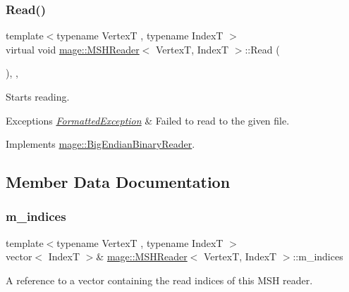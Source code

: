 \subsubsection{\texorpdfstring{Read()}{Read()}}
{\footnotesize\ttfamily template$<$typename VertexT , typename IndexT $>$ \\
virtual void \hyperlink{classmage_1_1_m_s_h_reader}{mage\+::\+M\+S\+H\+Reader}$<$ VertexT, IndexT $>$\+::Read (\begin{DoxyParamCaption}{ }\end{DoxyParamCaption})\hspace{0.3cm}{\ttfamily [override]}, {\ttfamily [private]}, {\ttfamily [virtual]}}

Starts reading.


\begin{DoxyExceptions}{Exceptions}
{\em \hyperlink{structmage_1_1_formatted_exception}{Formatted\+Exception}} & Failed to read to the given file. \\
\hline
\end{DoxyExceptions}


Implements \hyperlink{classmage_1_1_big_endian_binary_reader_af072965dea0319d6366b21cc6562bbf9}{mage\+::\+Big\+Endian\+Binary\+Reader}.



\subsection{Member Data Documentation}
\hypertarget{classmage_1_1_m_s_h_reader_ae96b703b052eb9951872683e17ab11ae}{}\label{classmage_1_1_m_s_h_reader_ae96b703b052eb9951872683e17ab11ae} 
\subsubsection{\texorpdfstring{m\+\_\+indices}{m\_indices}}
{\footnotesize\ttfamily template$<$typename VertexT , typename IndexT $>$ \\
vector$<$ IndexT $>$\& \hyperlink{classmage_1_1_m_s_h_reader}{mage\+::\+M\+S\+H\+Reader}$<$ VertexT, IndexT $>$\+::m\+\_\+indices\hspace{0.3cm}{\ttfamily [private]}}

A reference to a vector containing the read indices of this M\+SH reader. \hypertarget{classmage_1_1_m_s_h_reader_a6b4c0fbf02771cb7bc0ebcb685c3c30b}{}\label{classmage_1_1_m_s_h_reader_a6b4c0fbf02771cb7bc0ebcb685c3c30b} 
